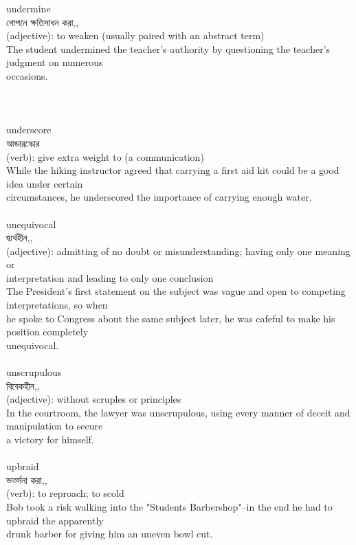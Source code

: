 \documentclass{article}
\begin{document}
{undermine}\\
{গোপনে ক্ষতিসাধন করা,,}\\
{(adjective): to weaken (usually paired with an abstract term)\\The student undermined the teacher's authority by questioning the teacher's judgment on numerous\\occasions.\\\\                                                                               \\}\\
{underscore}\\
{আন্ডারস্কোর}\\
{(verb): give extra weight to (a communication)\\While the hiking instructor agreed that carrying a first aid kit could be a good idea under certain\\circumstances, he underscored the importance of carrying enough water.\\}\\
{unequivocal}\\
{দ্ব্যর্থহীন,,}\\
{(adjective): admitting of no doubt or misunderstanding; having only one meaning or\\interpretation and leading to only one conclusion\\The President's first statement on the subject was vague and open to competing interpretations, so when\\he spoke to Congress about the same subject later, he was cafeful to make his position completely\\unequivocal.\\}\\
{unscrupulous}\\
{বিবেকহীন,,}\\
{(adjective): without scruples or principles\\In the courtroom, the lawyer was unscrupulous, using every manner of deceit and manipulation to secure\\a victory for himself.\\}\\
{upbraid}\\
{ভর্ত্সনা করা,,}\\
{(verb): to reproach; to scold\\Bob took a risk walking into the "Students Barbershop"--in the end he had to upbraid the apparently\\drunk barber for giving him an uneven bowl cut.\\}\\
\end{document}

